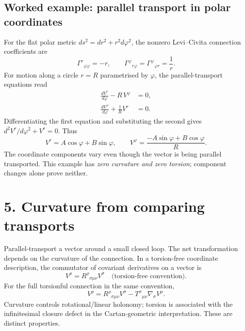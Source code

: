 \documentclass[10pt,a4paper]{article}
\begin{document}
\subsection*{Worked example: parallel transport in polar coordinates}
For the flat polar metric $ds^2=dr^2+r^2d\varphi^2$, the nonzero Levi--Civita connection coefficients are
\begin{equation}
\Gamma^r{}_{\varphi\varphi}=-r,\qquad
\Gamma^\varphi{}_{r\varphi}
=\Gamma^\varphi{}_{\varphi r}=\frac1r.
\end{equation}
For motion along a circle $r=R$ parametrised by $\varphi$, the parallel-transport equations read
\begin{align}
\frac{dV^r}{d\varphi}-R\,V^\varphi&=0,\\
\frac{dV^\varphi}{d\varphi}+\frac{1}{R}V^r&=0.
\end{align}
Differentiating the first equation and substituting the second gives
$d^2V^r/d\varphi^2+V^r=0$. Thus
\begin{equation}
V^r=A\cos\varphi+B\sin\varphi,\qquad
V^\varphi=\frac{-A\sin\varphi+B\cos\varphi}{R}.
\end{equation}
The coordinate components vary even though the vector is being parallel transported. This example has \emph{zero curvature and zero torsion}; component changes alone prove neither.

\section*{5. Curvature from comparing transports}
Parallel-transport a vector around a small closed loop. The net transformation depends on the curvature of the connection. In a torsion-free coordinate description, the commutator of covariant derivatives on a vector is
\begin{equation}
[\nabla_\mu,\nabla_\nu]V^\rho
=R^\rho{}_{\sigma\mu\nu}V^\sigma
\quad\text{(torsion-free convention)}.
\end{equation}
For the full torsionful connection in the same convention,
\begin{equation}
[\nabla_\mu,\nabla_\nu]V^\rho
=R^\rho{}_{\sigma\mu\nu}V^\sigma
-T^\sigma{}_{\mu\nu}\nabla_\sigma V^\rho.
\end{equation}
Curvature controls rotational/linear holonomy; torsion is associated with the infinitesimal closure defect in the Cartan-geometric interpretation. These are distinct properties.
\end{document}
